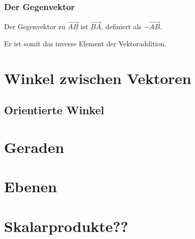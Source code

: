 \subsubsection{Der Gegenvektor}
Der Gegenvektor zu $\vec{AB}$ ist $\vec{BA}$, definiert als  $-\vec{AB}$.
\begin{Bemerkung}
Er ist somit das inverse Element der Vektoraddition.
\end{Bemerkung}
\section{Winkel zwischen Vektoren}\subsection{Orientierte Winkel}

\section{Geraden}
\section{Ebenen}
\section{Skalarprodukte??}
